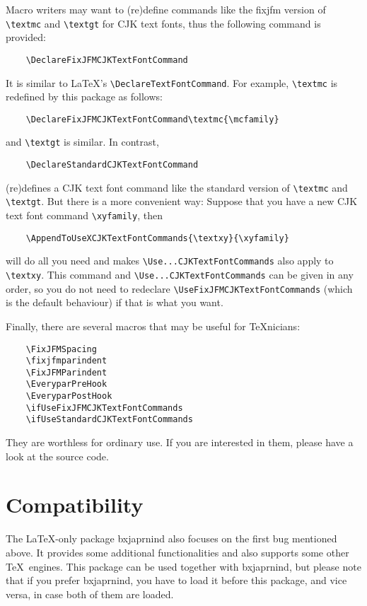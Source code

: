 \documentclass[a4paper]{article}
\newcommand\NormalSans{\normalfont\sffamily}
\newcommand\pkg[1]{{\protect\NormalSans#1}}
\begin{document}
Macro writers may want to (re)define commands like the \pkg{fixjfm} version of
\verb|\textmc| and \verb|\textgt| for CJK text fonts, thus the following command
is provided:
\begin{verbatim}
    \DeclareFixJFMCJKTextFontCommand
\end{verbatim}
It is similar to \LaTeX's \verb|\DeclareTextFontCommand|. For example,
\verb|\textmc| is redefined by this package as follows:
\begin{verbatim}
    \DeclareFixJFMCJKTextFontCommand\textmc{\mcfamily}
\end{verbatim}
and \verb|\textgt| is similar. In contrast,
\begin{verbatim}
    \DeclareStandardCJKTextFontCommand
\end{verbatim}
(re)defines a CJK text font command like the standard version of \verb|\textmc|
and \verb|\textgt|. But there is a more convenient way: Suppose that you have a
new CJK text font command \verb|\xyfamily|, then
\begin{verbatim}
    \AppendToUseXCJKTextFontCommands{\textxy}{\xyfamily}
\end{verbatim}
will do all you need and makes \verb|\Use...CJKTextFontCommands| also apply to
\verb|\textxy|. This command and \verb|\Use...CJKTextFontCommands| can be given
in any order, so you do not need to redeclare
\verb|\UseFixJFMCJKTextFontCommands| (which is the default behaviour) if that is
what you want.

Finally, there are several macros that may be useful for \TeX nicians:
\begin{verbatim}
    \FixJFMSpacing
    \fixjfmparindent
    \FixJFMParindent
    \EveryparPreHook
    \EveryparPostHook
    \ifUseFixJFMCJKTextFontCommands
    \ifUseStandardCJKTextFontCommands
\end{verbatim}
They are worthless for ordinary use. If you are interested in them, please have
a look at the source code.

\section{Compatibility}

The \LaTeX-only package \pkg{bxjaprnind} also focuses on the first bug mentioned
above. It provides some additional functionalities and also supports some other
\TeX\ engines. This package can be used together with \pkg{bxjaprnind}, but
please note that if you prefer \pkg{bxjaprnind}, you have to load it before this
package, and vice versa, in case both of them are loaded.
\end{document}
